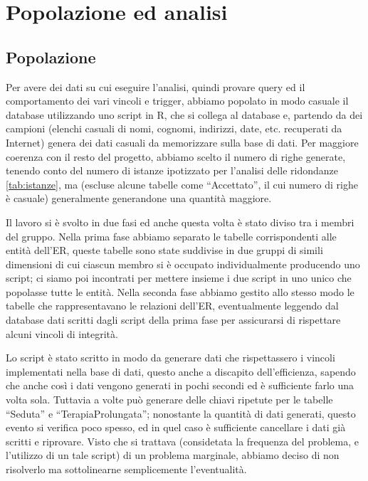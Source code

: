 \documentclass[11pt]{article}
\begin{document}
\section{Popolazione ed analisi}
\subsection{Popolazione}
\label{pop:popolazione}
Per avere dei dati su cui eseguire l'analisi, quindi provare query ed il comportamento dei vari vincoli e trigger, abbiamo popolato in modo casuale il database utilizzando uno script in R, che si collega al database e, partendo da dei campioni (elenchi casuali di nomi, cognomi, indirizzi, date, etc. recuperati da Internet) genera dei dati casuali da memorizzare sulla base di dati.
Per maggiore coerenza con il resto del progetto, abbiamo scelto il numero di righe generate, tenendo conto del numero di istanze ipotizzato per l'analisi delle ridondanze \ref{tab:istanze}, ma (escluse alcune tabelle come ``Accettato'', il cui numero di righe è casuale) generalmente generandone una quantità maggiore.

Il lavoro si è svolto in due fasi ed anche questa volta è stato diviso tra i membri del gruppo. Nella prima fase abbiamo separato le tabelle corrispondenti alle entità dell'ER, queste tabelle sono state suddivise in due gruppi di simili dimensioni di cui ciascun membro si è occupato individualmente producendo uno script; ci siamo poi incontrati per mettere insieme i due script in uno unico che popolasse tutte le entità.
Nella seconda fase abbiamo gestito allo stesso modo le tabelle che rappresentavano le relazioni dell'ER, eventualmente leggendo dal database dati scritti dagli script della prima fase per assicurarsi di rispettare alcuni vincoli di integrità.

Lo script è stato scritto in modo da generare dati che rispettassero i vincoli implementati nella base di dati, questo anche a discapito dell'efficienza, sapendo che anche così i dati vengono generati in pochi secondi ed è sufficiente farlo una volta sola.
Tuttavia a volte può generare delle chiavi ripetute per le tabelle ``Seduta'' e ``TerapiaProlungata''; nonostante la quantità di dati generati, questo evento si verifica poco spesso, ed in quel caso è sufficiente cancellare i dati già scritti e riprovare. Visto che si trattava (considetata la frequenza del problema, e l'utilizzo di un tale script) di un problema marginale, abbiamo deciso di non risolverlo ma sottolinearne semplicemente l'eventualità.
\end{document}
